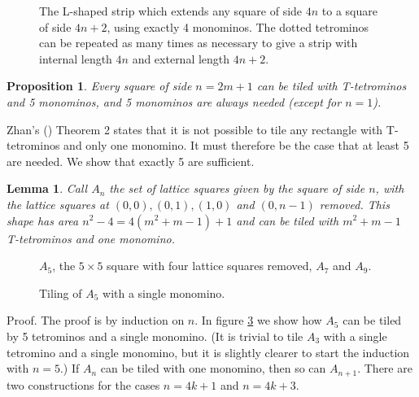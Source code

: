 \documentclass{article}
\theoremstyle{plain}
\newtheorem{proposition}[theorem]{Proposition}
\newtheorem{lemma}[theorem]{Lemma}
\begin{document}
\begin{figure}

\caption{The L-shaped strip which extends any square of side $4n$ to a square of side $4n+2$, using exactly 4 monominos. The dotted tetrominos can be repeated as many times as necessary to give a strip with internal length $4n$ and external length $4n + 2$.}
\label{lshaped}
\end{figure}

\begin{proposition}\label{odd}
Every square of side $n = 2m + 1$ can be tiled with T-tetrominos and 5 monominos, and 5 monominos are always needed (except for $n = 1$).
\end{proposition}
Zhan's (\cite{zhan}) Theorem 2 states that it is not possible to tile any rectangle with T-tetrominos and only one monomino. It must therefore be the case that at least 5 are needed. We show that exactly 5 are sufficient.

\begin{lemma}
Call $A_n$ the set of lattice squares given by the square of side $n$, with the lattice squares at $(0, 0), (0,1), (1, 0)$ and $(0, n-1)$ removed. This shape has area $n^2 - 4 = 4(m^2 + m - 1) + 1$ and can be tiled with $m^2 + m - 1$ T-tetrominos and one monomino.
\end{lemma}

\begin{figure}

\caption{$A_5$, the $5 \times 5$ square with four lattice squares removed, $A_7$ and $A_9$.}
\label{cropped}
\end{figure}

\begin{figure}

\caption{Tiling of $A_5$ with a single monomino.}
\label{five}
\end{figure}

{\sc Proof.}
The proof is by induction on $n$. In figure \ref{five} we show how $A_5$ can be tiled by 5 tetrominos and a single monomino. (It is trivial to tile $A_3$ with a single tetromino and a single monomino, but it is slightly clearer to start the induction with $n=5$.) If $A_n$ can be tiled with one monomino, then so can $A_{n+1}$. There are two constructions for the cases $n=4k+1$ and $n=4k+3$.



{}

\end{document}
